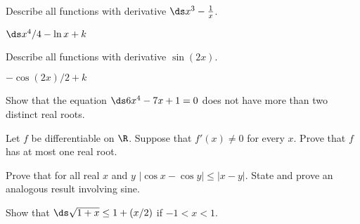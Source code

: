 \begin{exercises}
\begin{exercise} Describe all functions with derivative $\ds x^3-{1\over x}$.
\begin{answer} $\ds x^4/4 -\ln x +k$
\end{answer}\end{exercise}


\begin{exercise} Describe all functions with derivative $\sin(2x)$.
\begin{answer} $-\cos(2x)/2 +k$
\end{answer}\end{exercise}

\begin{exercise} Show that the equation $\ds 6x^4 -7x+1 =0$ does not have more
than two distinct real roots.
\end{exercise}

\begin{exercise} Let $f$ be differentiable on $\R$. Suppose that $f'(x) \neq
0$ for every $x$. Prove that $f$ has at most one real root.
\end{exercise}
 
\begin{exercise} Prove that for all real $x$ and $y$
$|\cos x -\cos y | \leq |x-y|$.
State and prove an analogous result involving sine.
\end{exercise}

\begin{exercise}
Show that
$\ds \sqrt{1+x} \le 1 +(x/2)$ if $-1<x<1$.
\end{exercise}

\end{exercises}

